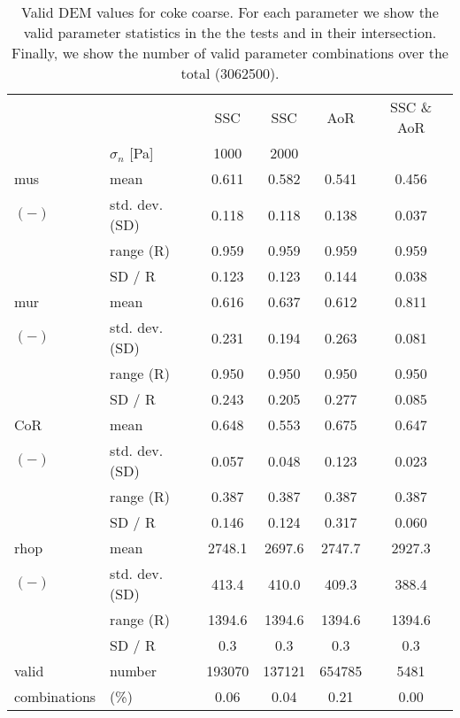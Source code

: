 \begin{table}[htbp] 
 \centering 
\begin{tabular}{ll|cccc} 
 \hline 
 &    & SSC & SSC & AoR   & SSC \& AoR \\ 
 & $\sigma_n$  [Pa]  & 1000 & 2000 &    &  \\ 
 \hline 
\acs{mus} & mean & 0.611 & 0.582 & 0.541 & 0.456 \\ 
$(-)$ & std. dev. (SD) & 0.118 & 0.118 & 0.138 & 0.037 \\ 
 & range (\acs{R}) & 0.959 & 0.959 & 0.959 & 0.959 \\ 
 & SD / R & 0.123 & 0.123 & 0.144 & 0.038 \\ 
 \hline 
\acs{mur} & mean & 0.616 & 0.637 & 0.612 & 0.811 \\ 
$(-)$ & std. dev. (SD) & 0.231 & 0.194 & 0.263 & 0.081 \\ 
 & range (\acs{R}) & 0.950 & 0.950 & 0.950 & 0.950 \\ 
 & SD / R & 0.243 & 0.205 & 0.277 & 0.085 \\ 
 \hline 
\acs{CoR} & mean & 0.648 & 0.553 & 0.675 & 0.647 \\ 
$(-)$ & std. dev. (SD) & 0.057 & 0.048 & 0.123 & 0.023 \\ 
 & range (\acs{R}) & 0.387 & 0.387 & 0.387 & 0.387 \\ 
 & SD / R & 0.146 & 0.124 & 0.317 & 0.060 \\ 
 \hline 
\acs{rhop} & mean & 2748.1 & 2697.6 & 2747.7 & 2927.3 \\ 
$(-)$ & std. dev. (SD) & 413.4 & 410.0 & 409.3 & 388.4 \\ 
 & range (\acs{R}) & 1394.6 & 1394.6 & 1394.6 & 1394.6 \\ 
 & SD / R &  0.3 &  0.3 &  0.3 &  0.3 \\ 
 \hline 
valid & number & 193070 & 137121 & 654785 & 5481 \\ 
combinations & (\%)  & 0.06 & 0.04 & 0.21 & 0.00 \\ 
 \hline 
\end{tabular} 
\caption[Valid DEM values for coke coarse]{Valid DEM values for coke coarse. For
each parameter we show the valid parameter statistics in the the tests and in their intersection. Finally, we show the number of valid parameter combinations over the total (3062500).}
\label{tab:25DEMvalidvaluescokecoarse} 
\end{table}